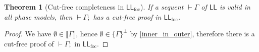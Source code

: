 \documentclass[11pt]{article}
\newtheorem{theorem}{Theorem}[section]
\newcommand\LL{\textsf{LL}}
\newcommand\0{\textbf{0}}
\newcommand\1{\textbf{1}}
\newcommand\LLfoc{{\LL_\text{foc}}}
\newcommand\sem[1]{{\llbracket #1 \rrbracket}}
\begin{document}
\begin{theorem}[Cut-free completeness in $\LLfoc$]
    If a sequent $\vdash \Gamma$ of $\LL$ is valid in all phase models, then $\vdash \Gamma;$ has a cut-free proof in $\LLfoc$.
\end{theorem}
\begin{proof}
    We have $\emptyset \in \sem{\Gamma}$, hence $\emptyset \in \{\Gamma\}^\perp$ by
    \cref{inner_in_outer}, therefore there is a cut-free proof of $\vdash \Gamma;$ in $\LLfoc$.
\end{proof}

\printbibliography
\end{document}
